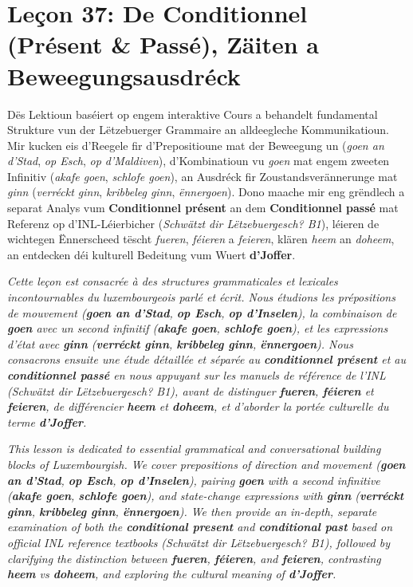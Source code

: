 \chapter[Leçon 37: Conditionnel, Zäiten a Beweegungsausdréck]{Leçon 37: De Conditionnel (Présent \& Passé), Zäiten a Beweegungsausdréck}

Dës Lektioun baséiert op engem interaktive Cours a behandelt fundamental Strukture vun der Lëtzebuerger Grammaire an alldeegleche Kommunikatioun. Mir kucken eis d'Reegele fir d'Prepositioune mat der Beweegung un (\textit{goen an d'Stad}, \textit{op Esch}, \textit{op d'Maldiven}), d'Kombinatioun vu \textit{goen} mat engem zweeten Infinitiv (\textit{akafe goen}, \textit{schlofe goen}), an Ausdréck fir Zoustandsverännerunge mat \textit{ginn} (\textit{verréckt ginn}, \textit{kribbeleg ginn}, \textit{ënnergoen}). Dono maache mir eng grëndlech a separat Analys vum \textbf{Conditionnel présent} an dem \textbf{Conditionnel passé} mat Referenz op d'INL-Léierbicher (\textit{Schwätzt dir Lëtzebuergesch? B1}), léieren de wichtegen Ënnerscheed tëscht \textit{fueren}, \textit{féieren} a \textit{feieren}, klären \textit{heem} an \textit{doheem}, an entdecken déi kulturell Bedeitung vum Wuert \textbf{d'Joffer}.

\textit{Cette leçon est consacrée à des structures grammaticales et lexicales incontournables du luxembourgeois parlé et écrit. Nous étudions les prépositions de mouvement (\textbf{goen an d'Stad}, \textbf{op Esch}, \textbf{op d'Inselen}), la combinaison de \textbf{goen} avec un second infinitif (\textbf{akafe goen}, \textbf{schlofe goen}), et les expressions d'état avec \textbf{ginn} (\textbf{verréckt ginn}, \textbf{kribbeleg ginn}, \textbf{ënnergoen}). Nous consacrons ensuite une étude détaillée et séparée au \textbf{conditionnel présent} et au \textbf{conditionnel passé} en nous appuyant sur les manuels de référence de l'INL (\textit{Schwätzt dir Lëtzebuergesch? B1}), avant de distinguer \textbf{fueren}, \textbf{féieren} et \textbf{feieren}, de différencier \textbf{heem} et \textbf{doheem}, et d'aborder la portée culturelle du terme \textbf{d'Joffer}.}

\textit{This lesson is dedicated to essential grammatical and conversational building blocks of Luxembourgish. We cover prepositions of direction and movement (\textbf{goen an d'Stad}, \textbf{op Esch}, \textbf{op d'Inselen}), pairing \textbf{goen} with a second infinitive (\textbf{akafe goen}, \textbf{schlofe goen}), and state-change expressions with \textbf{ginn} (\textbf{verréckt ginn}, \textbf{kribbeleg ginn}, \textbf{ënnergoen}). We then provide an in-depth, separate examination of both the \textbf{conditional present} and \textbf{conditional past} based on official INL reference textbooks (\textit{Schwätzt dir Lëtzebuergesch? B1}), followed by clarifying the distinction between \textbf{fueren}, \textbf{féieren}, and \textbf{feieren}, contrasting \textbf{heem} vs \textbf{doheem}, and exploring the cultural meaning of \textbf{d'Joffer}.}

